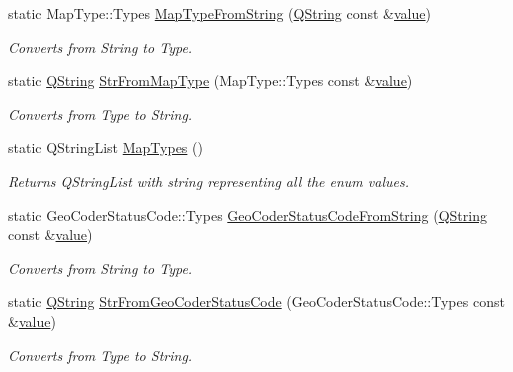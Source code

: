 \begin{DoxyCompactItemize}
\item 
static Map\-Type\-::\-Types \hyperlink{group___o_p_map_widget_gae829b229cde8f7beebc9f3c0981f674c}{Map\-Type\-From\-String} (\hyperlink{group___u_a_v_objects_plugin_gab9d252f49c333c94a72f97ce3105a32d}{Q\-String} const \&\hyperlink{glext_8h_aa0e2e9cea7f208d28acda0480144beb0}{value})
\begin{DoxyCompactList}\small\item\em Converts from String to Type. \end{DoxyCompactList}\item 
static \hyperlink{group___u_a_v_objects_plugin_gab9d252f49c333c94a72f97ce3105a32d}{Q\-String} \hyperlink{group___o_p_map_widget_ga25fd053ddcb478b681163806de9514b7}{Str\-From\-Map\-Type} (Map\-Type\-::\-Types const \&\hyperlink{glext_8h_aa0e2e9cea7f208d28acda0480144beb0}{value})
\begin{DoxyCompactList}\small\item\em Converts from Type to String. \end{DoxyCompactList}\item 
static Q\-String\-List \hyperlink{group___o_p_map_widget_gad4c683c34a93de153146c87382c53719}{Map\-Types} ()
\begin{DoxyCompactList}\small\item\em Returns Q\-String\-List with string representing all the enum values. \end{DoxyCompactList}\item 
static Geo\-Coder\-Status\-Code\-::\-Types \hyperlink{group___o_p_map_widget_gad60261d49176a6eea081705bcd37c2b7}{Geo\-Coder\-Status\-Code\-From\-String} (\hyperlink{group___u_a_v_objects_plugin_gab9d252f49c333c94a72f97ce3105a32d}{Q\-String} const \&\hyperlink{glext_8h_aa0e2e9cea7f208d28acda0480144beb0}{value})
\begin{DoxyCompactList}\small\item\em Converts from String to Type. \end{DoxyCompactList}\item 
static \hyperlink{group___u_a_v_objects_plugin_gab9d252f49c333c94a72f97ce3105a32d}{Q\-String} \hyperlink{group___o_p_map_widget_ga8641f35e4dcfdeb18e53899718555abb}{Str\-From\-Geo\-Coder\-Status\-Code} (Geo\-Coder\-Status\-Code\-::\-Types const \&\hyperlink{glext_8h_aa0e2e9cea7f208d28acda0480144beb0}{value})
\begin{DoxyCompactList}\small\item\em Converts from Type to String. \end{DoxyCompactList}\item 

\end{DoxyCompactItemize}
